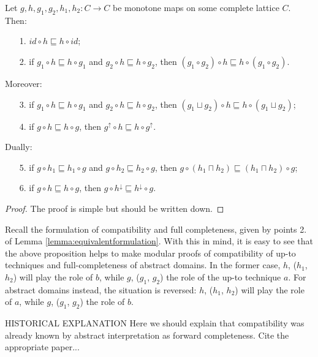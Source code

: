 \documentclass{llncs}
\begin{document}
\begin{proposition}[modularity]\label{prop:mod}
Let $g,h,g_1,g_2,h_1,h_2\colon C\to C$ be monotone maps on some complete lattice $C$. 
Then:
\begin{enumerate}
\item[1.] $id \circ h \sqsubseteq h \circ id$;
\item[2.] if  $g_1 \circ h \sqsubseteq h \circ g_1$ and $g_2 \circ h \sqsubseteq h \circ g_2$, then $(g_1 \circ g_2) \circ h \sqsubseteq h \circ (g_1 \circ g_2)$.
\end{enumerate}
Moreover:
\begin{enumerate}
\item[3.] if  $g_1 \circ h \sqsubseteq h \circ g_1$ and $g_2 \circ h \sqsubseteq h \circ g_2$, then $(g_1 \sqcup g_2) \circ h \sqsubseteq h \circ (g_1 \sqcup g_2)$;
\item[4.] if  $g \circ h \sqsubseteq h \circ g$, then $g^\uparrow \circ h \sqsubseteq h \circ g^\uparrow$.
\end{enumerate}
Dually:
\begin{enumerate}
\item[5.] if  $g \circ h_1 \sqsubseteq h_1 \circ g$ and $g \circ h_2 \sqsubseteq h_2 \circ g$, then $g\circ  (h_1 \sqcap  h_2) \sqsubseteq (h_1 \sqcap h_2) \circ g$;
\item[6.] if  $g \circ h \sqsubseteq h \circ g$, then $g \circ h^\downarrow \sqsubseteq h^\downarrow \circ g$.
\end{enumerate}
\end{proposition}
\begin{proof}
The proof is simple but should be written down.
\end{proof}

Recall the formulation of compatibility and full completeness, given by points 2. of Lemma \ref{lemma:equivalentformulation}.
With this in mind, it is easy to see that the above proposition helps to make modular proofs of compatibility of up-to techniques and full-completeness of abstract domains. In the former case,  $h$, ($h_1$, $h_2$) will play the role of $b$, while $g$, ($g_1$, $g_2$) the role of the up-to technique $a$. For abstract domains instead, the situation is reversed: $h$, ($h_1$, $h_2$) will play the role of $a$, while $g$, ($g_1$, $g_2$) the role of $b$.



\begin{remark}
HISTORICAL EXPLANATION Here we should explain that compatibility was already known by abstract interpretation as forward completeness. Cite the appropriate paper...
\end{remark}
\end{document}
